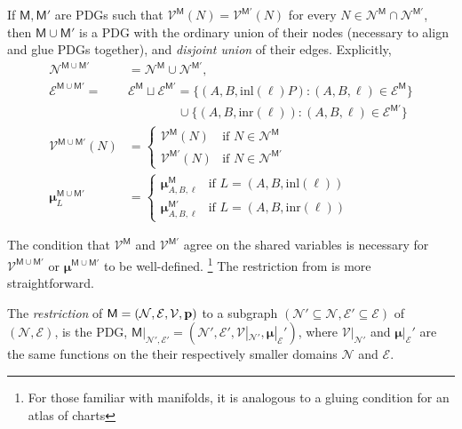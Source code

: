 \documentclass{article}
\newcommand{\notation}[2][]{#1}
\renewcommand{\notation}[2][]{{\color{notationcolor} #2}}
\newcommand{\vfullfootnote}[1]{}
\renewcommand{\vfullfootnote}[1]{\footnote{#1}}
\newcommand{\bmu}{\boldsymbol{\mu}}
\newcommand{\V}{\mathcal V}
\newcommand{\N}{\mathcal N}
\newcommand{\Ed}{\mathcal E}
\newcommand{\sfM}{\mathsf M}
\newcommand{\MN}{PDG}
\numberwithin{equation}{section}
\begin{document}
\begin{vfull}
	\begin{defn}[union] \label{def:model-union}
		If $\sfM, \sfM'$ are \MN s such that $\V^\sfM(N) = \V^{\sfM'}(N)$ for every $N \in  \N^{\sfM} \cap \N^{\sfM'}$, then $\sfM \cup \sfM'$ is a PDG with the ordinary union of their nodes (necessary to align and glue PDGs together), and \emph{disjoint union} of their edges. \notation{Explicitly,
		\begin{align*}
			\N^{\sfM \cup \sfM'} &= \N^\sfM \cup \N^{\sfM'},  \\
			\Ed^{\sfM \cup \sfM'} \!=& \Ed^\sfM \sqcup \Ed^{\sfM'}\!
				=  \{ (A, B, \text{inl}(\ell)P) : (A,B,\ell)\in \Ed^\sfM \}  \\
					&\qquad\qquad \cup \{ (A, B, \text{inr}(\ell)) : (A,B,\ell)\in \Ed^{\sfM'} \} \\ 
			\V^{\sfM \cup \sfM'} (N) &= \begin{cases}
					\V^{\sfM}(N) & \text{if }N \in \N^\sfM \\
					\V^{\sfM'}(N) &\text{if }N \in \N^{\sfM'} 
				\end{cases}\\
			\bmu^{\sfM \cup \sfM'}_L &= \begin{cases}
				\bmu^{\sfM}_{A, B, \ell} &\text{if } L = (A, B, \text{inl} (\ell)) \\
				\bmu^{\sfM'}_{A, B, \ell} &\text{if } L = (A, B, \text{inr} (\ell)) 
			\end{cases}
		\end{align*}}
	\end{defn}
	The condition that $\V^\sfM$ and $\V^{\sfM'}$ agree on the shared variables is necessary for $\V^{\sfM\cup \sfM'}$ or $\bmu^{\sfM \cup \sfM'}$ to be well-defined.%
		\vfullfootnote{For those familiar with manifolds, it is analogous to a gluing condition for an atlas of charts}
	The restriction from  is more straightforward.%
	
	\begin{defn}[restriction]\label{def:restriction}
		The \emph{restriction} of $\sfM = \mnvars[]$ to a subgraph $(\N' \subseteq \N, \Ed' \subseteq \Ed)$ of $(\N, \Ed)$, is the PDG, $\sfM|_{\N', \Ed'} = (\N', \Ed', \V |_{\N'}, \bmu|_\Ed')$, where 
		$\V|_{\N'}$ and $\bmu|_\Ed'$ are the same functions on the their respectively smaller domains $\N$ and $\Ed$. 
	\end{defn}
	



\end{vfull}
\end{document}
